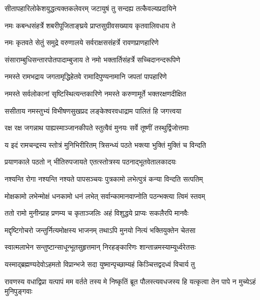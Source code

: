 \twolineshloka
{सीतापहारिलोकेशयुद्धत्यक्तकलेवरम्}
{जटायुषं तु सन्दह्य तत्कैवल्यप्रदायिने}%

\twolineshloka
{नमः कबन्धसंहर्त्रे शबरीपूजिताङ्घ्रये}
{प्राप्तसुग्रीवसख्याय कृतवालिवधाय ते}%

\twolineshloka
{नमः कृतवते सेतुं समुद्रे वरुणालये}
{सर्वराक्षससंहर्त्रे रावणप्राणहारिणे}%

\twolineshloka
{संसाराम्बुधिसन्तारपोतपादाम्बुजाय ते}
{नमो भक्तार्तिसंहर्त्रे सच्चिदानन्दरूपिणे}%

\twolineshloka
{नमस्ते रामभद्राय जगतामृद्धिहेतवे}
{रामादिपुण्यनामानि जपतां पापहारिणे}%

\twolineshloka
{नमस्ते सर्वलोकानां सृष्टिस्थित्यन्तकारिणे}
{नमस्ते करुणामूर्ते भक्तरक्षणदीक्षित}%

\twolineshloka
{ससीताय नमस्तुभ्यं विभीषणसुखप्रद}
{लङ्केश्वरवधाद्राम पालितं हि जगत्त्वया}%

\twolineshloka
{रक्ष रक्ष जगन्नाथ पाह्यस्माञ्जानकीपते}
{स्तुत्वैवं मुनयः सर्वे तूष्णीं तस्थुर्द्विजोत्तमाः}%


\twolineshloka
{य इदं रामचन्द्रस्य स्तोत्रं मुनिभिरीरितम्}
{त्रिसन्ध्यं पठते भक्त्या भुक्तिं मुक्तिं च विन्दति}%

\twolineshloka
{प्रयाणकाले पठतो न् भीतिरुपजायते}
{एतत्स्तोत्रस्य पठनाद्भूतवेतालकादयः}%

\twolineshloka
{नश्यन्ति रोगा नश्यन्ति नश्यते पापसञ्चयः}
{पुत्रकामो लभेत्पुत्रं कन्या विन्दति सत्पतिम्}%

\twolineshloka
{मोक्षकामो लभेन्मोक्षं धनकामो धनं लभेत्}
{सर्वान्कामानवाप्नोति पठन्भक्त्या त्विमं स्तवम्}%

\twolineshloka
{ततो रामो मुनीन्प्राह प्रणम्य च कृताञ्जलिः}
{अहं विशुद्धये प्राप्यः सकलैरपि मानवैः}%

\twolineshloka
{मद्दृष्टिगोचरो जन्तुर्नित्यमोक्षस्य भाजनम्}
{तथाऽपि मुनयो नित्यं भक्तियुक्तेन चेतसा}%

\twolineshloka
{स्वात्मलाभेन सन्तुष्टान्साधून्भूतसुहृत्तमान्}
{निरहङ्कारिणः शान्तान्नमस्याम्यूर्ध्वरेतसः}%

\twolineshloka
{यस्माद्ब्रह्मण्यदेवोऽहमतो विप्रान्भजे सदा}
{युष्मान्पृच्छाम्यहं किञ्चित्तद्वदध्वं विचार्य तु}%

\threelineshloka
{रावणस्य वधाद्विप्रा यत्पापं मम वर्तते}
{तस्य मे निष्कृतिं ब्रूत पौलस्त्यवधजस्य हि}
{यत्कृत्वा तेन पापे न मुच्येऽहं मुनिपुङ्गवाः}%



